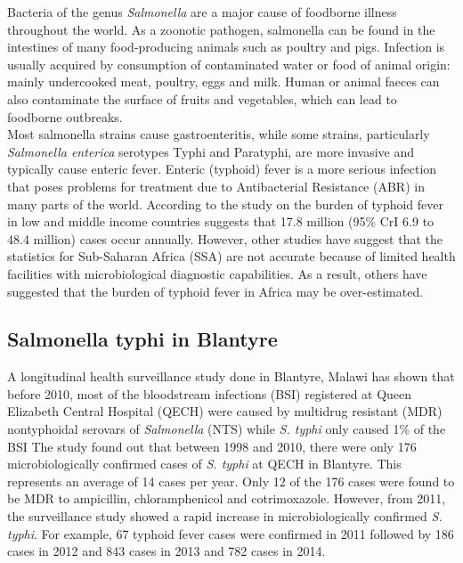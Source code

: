 \documentclass[12pt,a4paper]{report}
\begin{document}
Bacteria of the genus \textit{Salmonella} are a major cause of foodborne illness throughout the world. As a zoonotic pathogen, salmonella can be found in the intestines of many food-producing animals such as poultry and pigs. Infection is usually acquired by consumption of contaminated water or food of animal origin: mainly undercooked meat, poultry, eggs and milk. Human or animal faeces can also contaminate the surface of fruits and vegetables, which can lead to foodborne outbreaks.\cite{WHO} \\

Most salmonella strains cause gastroenteritis, while some strains, particularly \textit{Salmonella enterica} serotypes Typhi and Paratyphi, are more invasive and typically cause enteric fever. Enteric (typhoid) fever is a more serious infection that poses problems for treatment due to Antibacterial Resistance (ABR) in many parts of the world. According to the study on the burden of typhoid fever in low and middle income countries suggests that 17.8 million (95\% CrI 6.9 to 48.4 million) cases occur annually.\cite{Antillon} However, other studies have suggest that the statistics for Sub-Saharan Africa (SSA) are not accurate because of limited health facilities with microbiological diagnostic capabilities.\cite{Peters} As a result, others have suggested that the burden of typhoid fever in Africa may be over-estimated. \cite{Mweu}

\subsection{Salmonella typhi in Blantyre}

A longitudinal health surveillance study done in Blantyre, Malawi has shown that before 2010, most of the bloodstream infections (BSI) registered at Queen Elizabeth Central Hospital (QECH) were caused by multidrug resistant (MDR) nontyphoidal serovars of \textit{Salmonella} (NTS) while \textit{S. typhi} only caused 1\% of the BSI \cite{Gordon}\cite{Musicha}\cite{Feasey} The study found out that between 1998 and 2010, there were only 176 microbiologically confirmed cases of \textit{S. typhi} at QECH in Blantyre. This represents an average of 14 cases per year. Only 12 of the 176 cases were found to be MDR to ampicillin, chloramphenicol and cotrimoxazole.\cite{Feasey} However, from 2011, the surveillance study showed a rapid increase in microbiologically confirmed \textit{S. typhi}. For example, 67 typhoid fever cases were confirmed in 2011 followed by 186 cases in 2012 and 843 cases in 2013 and 782 cases in 2014.\cite{Feasey}\\
\end{document}
